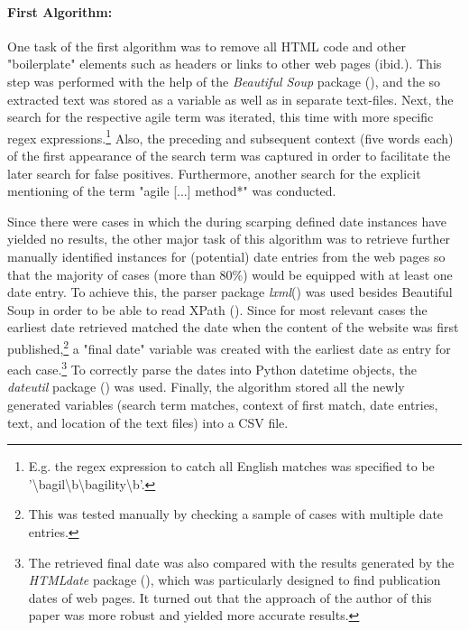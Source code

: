 \paragraph{First Algorithm:} One task of the first algorithm was to remove all HTML code and other "boilerplate" elements such as headers or links to other web pages (ibid.). This step was performed with the help of the \textit{Beautiful Soup} package (\cite{Richardson2007}), and the so extracted text was stored as a variable as well as in separate text-files. Next, the search for the respective agile term was iterated, this time with more specific regex expressions.\footnote{E.g. the regex expression to catch all English matches was specified to be '\textbackslash bagil\textbackslash b\textbar \textbackslash bagility\textbackslash b'.} Also, the preceding and subsequent context (five words each) of the first appearance of the search term was captured in order to facilitate the later search for false positives. Furthermore, another search for the explicit mentioning of the term "agile [...] method*" was conducted.\par 
Since there were cases in which the during scarping defined date instances have yielded no results, the other major task of this algorithm was to retrieve further manually identified instances for (potential) date entries from the web pages so that the majority of cases (more than 80\%) would be equipped with at least one date entry. To achieve this, the parser package \textit{lxml}(\cite{Faassen2006}) was used besides Beautiful Soup in order to be able to read XPath (\cite{Clark1999}). Since for most relevant cases the earliest date retrieved matched the date when the content of the website was first published,\footnote{This was tested manually by checking a sample of cases with multiple date entries.} a "final date" variable was created with the earliest date as entry for each case.\footnote{The retrieved final date was also compared with the results generated by the \textit{HTMLdate} package (\cite{Barbaresi2020}), which was particularly designed to find publication dates of web pages. It turned out that the approach of the author of this paper was more robust and yielded more accurate results.} To correctly parse the dates into Python datetime objects, the \textit{dateutil} package (\cite{Niemeyer2003}) was used. Finally, the algorithm stored all the newly generated variables (search term matches, context of first match, date entries, text, and location of the text files) into a CSV file.\par
